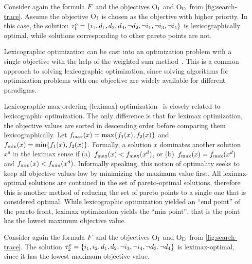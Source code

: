 \begin{example}
  Consider again the formula $F$ and the objectives $\textsc{O}_{\text{I}}$ and $\textsc{O}_{\text{D}}$ from \cref{fig:search-trace}.
  Assume the objective $\textsc{O}_{\text{I}}$ is chosen as the objective with higher priority.
  In this case, the solution $\tau^o_1 = {\{i_1,\allowbreak d_1,\allowbreak d_3,\allowbreak d_4,\allowbreak \lnot d_2,\allowbreak \lnot i_1,\allowbreak \lnot i_3,\allowbreak \lnot i_4\}}$ is lexicographically optimal, while solutions corresponding to other pareto points are not.
\end{example}

Lexicographic optimization can be cast into an optimization problem with a single objective with the help of the weighted sum method~\autocite{Ehrgott2005-3}.
This is a common approach to solving lexicographic optimization, since solving algorithms for optimization problems with one objective are widely available for different paradigms.

Lexicographic max-ordering (leximax) optimization~\autocite{Ehrgott2005-5} is closely related to lexicographic optimization.
The only difference is that for leximax optimization, the objective values are sorted in descending order before comparing them lexicographically.
Let $f_\text{max}(x) = \max\{f_1(x), f_2(x)\}$ and $f_\text{min}(x) = \min\{f_1(x), f_2(x)\}$.
Formally, a solution $x$ dominates another solution $x^d$ in the leximax sense if (a)~$f_\text{max}(x) < f_\text{max}(x^d)$, or (b)~$f_\text{max}(x) = f_\text{max}(x^d)$ and $f_\text{min}(x) < f_\text{min}(x^d)$.
Informally speaking, this notion of optimality seeks to keep all objective values low by minimizing the maximum value first.
All leximax-optimal solutions are contained in the set of pareto-optimal solutions, therefore this is another method of reducing the set of pareto points to a single one that is considered optimal.
While lexicographic optimization yielded an ``end point'' of the pareto front, leximax optimization yields the ``min point'', that is the point has the lowest maximum objective value.

\begin{example}
  Consider again the formula $F$ and the objectives $\textsc{O}_{\text{I}}$ and $\textsc{O}_{\text{D}}$ from \cref{fig:search-trace}.
  The solution $\tau^o_2 = {\{i_1,\allowbreak i_2,\allowbreak d_1,\allowbreak d_2,\allowbreak \lnot i_3,\allowbreak \lnot i_4,\allowbreak \lnot d_3,\allowbreak \lnot d_4\}}$ is leximax-optimal, since it has the lowest maximum objective value.
\end{example}

